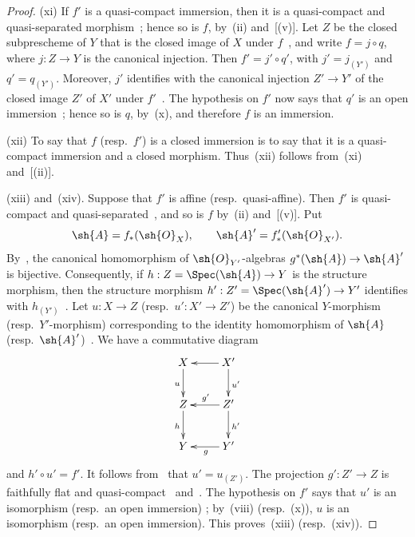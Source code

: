\begin{proof}

\textnormal{(xi)} If $f'$ is a quasi-compact immersion, then it is a
quasi-compact and quasi-separated morphism~; hence so
is $f$, by~\textnormal{(ii)} and~[(v)]. Let $Z$ be the
closed subprescheme of $Y$ that is the closed image of $X$ under
$f$~, and write $f=j\circ q$, where $j:Z\to Y$ is the
canonical injection. Then $f'=j'\circ q'$, with
$j'=j_{(Y')}$ and $q'=q_{(Y')}$. Moreover, $j'$ identifies with the
canonical injection $Z'\to Y'$ of the closed image $Z'$ of $X'$ under
$f'$~. The hypothesis on $f'$ now says that $q'$ is an
open immersion~; hence so is $q$,
by~\textnormal{(x)}, and therefore $f$ is an immersion.

\textnormal{(xii)} To say that $f$ \textnormal{(}resp.\ $f'$\textnormal{)}
is a closed immersion is to say that it is a quasi-compact immersion
and a closed morphism. Thus~\textnormal{(xii)} follows
from~\textnormal{(xi)} and~[(ii)].

\textnormal{(xiii)} and~\textnormal{(xiv)}. Suppose that $f'$ is affine
\textnormal{(}resp.\ quasi-affine\textnormal{)}. Then $f'$ is
quasi-compact and quasi-separated~, and so is $f$
by~\textnormal{(ii)} and~[(v)]. Put
\[
  \sh{A}=f_*(\sh{O}_X),\qquad
  \sh{A}'=f'_*(\sh{O}_{X'}).
\]
By~, the canonical homomorphism of
$\sh{O}_{Y'}$-algebras $g^*(\sh{A})\to\sh{A}'$ is bijective.
Consequently, if $h:Z=\Spec(\sh{A})\to Y$ is the structure morphism,
then the structure morphism $h':Z'=\Spec(\sh{A}')\to Y'$ identifies
with $h_{(Y')}$~. Let $u:X\to Z$
\textnormal{(}resp.\ $u':X'\to Z'$\textnormal{)} be the canonical
$Y$-morphism \textnormal{(}resp.\ $Y'$-morphism\textnormal{)}
corresponding to the identity homomorphism of $\sh{A}$
\textnormal{(}resp.\ $\sh{A}'$\textnormal{)}~.
We have a commutative diagram
\[
\xymatrix{
  X \ar[d]_u & X' \ar[l] \ar[d]^{u'} \\
  Z \ar[d]_h & Z' \ar[l]_{g'} \ar[d]^{h'} \\
  Y & Y' \ar[l]^g
}
\]
and $h'\circ u'=f'$. It follows from~ that
$u'=u_{(Z')}$. The projection $g':Z'\to Z$ is faithfully flat and
quasi-compact~ and~. The hypothesis on
$f'$ says that $u'$ is an isomorphism
\textnormal{(}resp.\ an open immersion\textnormal{)}
; by~\textnormal{(viii)}
\textnormal{(}resp.\ (x)\textnormal{)}, $u$ is an
isomorphism \textnormal{(}resp.\ an open immersion\textnormal{)}. This
proves~\textnormal{(xiii)} \textnormal{(}resp.\
\textnormal{(xiv)}\textnormal{)}.


\end{proof}
